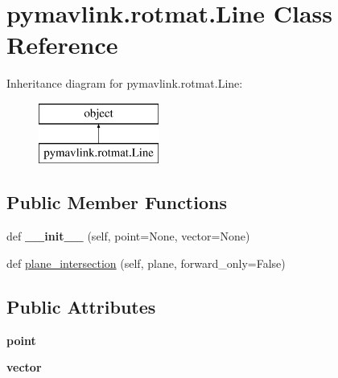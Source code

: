 \hypertarget{classpymavlink_1_1rotmat_1_1Line}{}\section{pymavlink.\+rotmat.\+Line Class Reference}
\label{classpymavlink_1_1rotmat_1_1Line}
Inheritance diagram for pymavlink.\+rotmat.\+Line\+:\begin{figure}[H]
\begin{center}
\leavevmode
\includegraphics[height=2.000000cm]{classpymavlink_1_1rotmat_1_1Line}
\end{center}
\end{figure}
\subsection*{Public Member Functions}
\begin{DoxyCompactItemize}
\item 
\mbox{\label{classpymavlink_1_1rotmat_1_1Line_a885c853f5c7389037763a1c096e3522b}} 
def {\bfseries \+\_\+\+\_\+init\+\_\+\+\_\+} (self, point=None, vector=None)
\item 
def \hyperlink{classpymavlink_1_1rotmat_1_1Line_a798d84ee7809f0fd49a80421776f78b4}{plane\+\_\+intersection} (self, plane, forward\+\_\+only=False)
\end{DoxyCompactItemize}
\subsection*{Public Attributes}
\begin{DoxyCompactItemize}
\item 
\mbox{\label{classpymavlink_1_1rotmat_1_1Line_ae9557b1db18c60cf9a0a06b1b17e739c}} 
{\bfseries point}
\item 
\mbox{\label{classpymavlink_1_1rotmat_1_1Line_adaf0efb163f4cf8833c57d8f188757be}} 
{\bfseries vector}
\end{DoxyCompactItemize}


